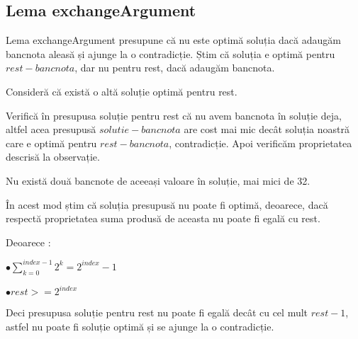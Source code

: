     \subsection{Lema exchangeArgument}
    Lema exchangeArgument presupune că nu este optimă soluția dacă adaugăm bancnota aleasă și ajunge la o contradicție.
    Știm că soluția e optimă pentru $rest - bancnota$, dar nu pentru rest, dacă adaugăm bancnota.\par
    Consideră că există o altă soluție optimă pentru rest.\par
    Verifică în presupusa soluție pentru rest că nu avem bancnota în soluție deja, altfel acea presupusă 
    $solutie - bancnota$ are cost mai mic decât soluția noastră care e optimă pentru $rest - bancnota$, contradicție.
    Apoi verificăm proprietatea descrisă la observație.\par
    Nu există două bancnote de aceeași valoare în soluție, mai mici de 32.\par
    În acest mod știm că soluția presupusă nu poate fi optimă, deoarece, dacă respectă proprietatea
    suma produsă de aceasta nu poate fi egală cu rest. \par
    Deoarece :\par
    $\bullet \sum_{k=0}^{index-1} 2^{k} = 2^{index}-1 $\par
    $\bullet rest > = 2^{index} $ \par
    Deci presupusa soluție pentru rest nu poate fi egală decât cu cel mult $rest-1$, astfel nu poate fi soluție optimă și se ajunge la o contradicție. 


